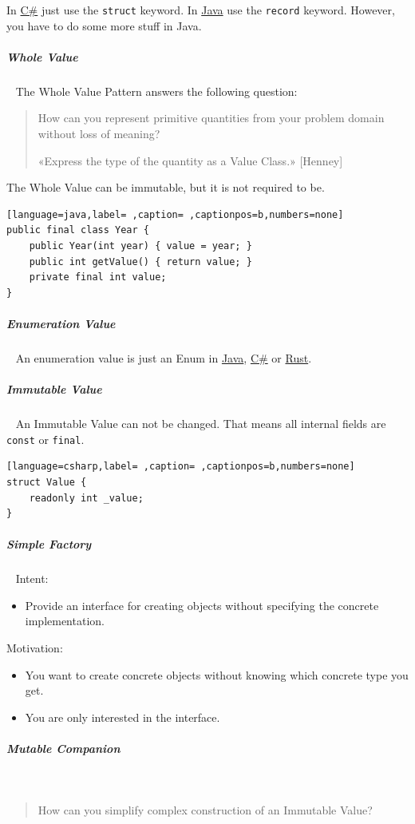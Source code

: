 \documentclass[8pt,twoside,landscape]{extarticle}
\begin{document}
\begin{multicols}{4}
In \href{../../../roam/20211003114158-c.org}{C\#} just use the \texttt{struct} keyword.
In \href{../../../roam/20201116150053-java.org}{Java} use the \texttt{record} keyword.
However, you have to do some more stuff in Java.
\subparagraph{Whole Value} \
\label{sec:org6cd671f}
The Whole Value Pattern answers the following question:
\begin{quote}
How can you represent primitive quantities from your problem domain without loss
of meaning?

«Express the type of the quantity as a Value Class.» [Henney]
\end{quote}

The Whole Value can be immutable, but it is not required to be.
\begin{lstlisting}[language=java,label= ,caption= ,captionpos=b,numbers=none]
public final class Year {
    public Year(int year) { value = year; }
    public int getValue() { return value; }
    private final int value;
}
\end{lstlisting}

\subparagraph{Enumeration Value} \
\label{sec:org99e3029}
An enumeration value is just an Enum in \href{../../../roam/20201116150053-java.org}{Java}, \href{../../../roam/20211003114158-c.org}{C\#} or \href{../../../roam/20200904153952-rust.org}{Rust}.
\subparagraph{Immutable Value} \
\label{sec:orgf8d38aa}
An Immutable Value can not be changed.
That means all internal fields are \texttt{const} or \texttt{final}.

\begin{lstlisting}[language=csharp,label= ,caption= ,captionpos=b,numbers=none]
struct Value {
    readonly int _value;
}
\end{lstlisting}
\subparagraph{Simple Factory} \
\label{sec:org5cb430a}
Intent:
\begin{itemize}
\item Provide an interface for creating objects without specifying the concrete implementation.
\end{itemize}

Motivation:
\begin{itemize}
\item You want to create concrete objects without knowing which concrete type you get.
\item You are only interested in the interface.
\end{itemize}
\subparagraph{Mutable Companion} \
\label{sec:org04d906f}
\begin{quote}
How can you simplify complex construction of an Immutable Value?
\end{quote}



\end{multicols}
\end{document}
